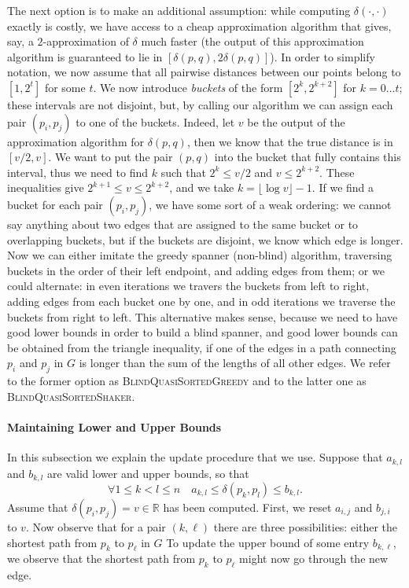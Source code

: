 \documentclass[a4paper,USenglish]{socg-lipics-v2018}
\newcommand{\R}{\mathbb{R}}
\newcommand{\dist}{\delta}
\begin{document}
The next option is to make an additional assumption: while
computing $\dist(\cdot, \cdot)$ exactly is costly, we have access to a cheap approximation algorithm
that gives, say, a $2$-approximation of $\dist$ much faster (the output of this approximation algorithm is guaranteed to
lie in $[\dist(p,q), 2 \dist(p,q)]$). In order to simplify notation, we now assume
that all pairwise distances between our points belong to $[1, 2^t]$ for some $t$.
We now introduce \textit{buckets} of the form $[2^k, 2^{k+2}]$ for $k = 0 \dots t$;
these intervals are not disjoint, but, by calling our algorithm we can assign
each pair $(p_i, p_j)$ to one of the buckets.
Indeed, let $v$ be the output of the approximation algorithm for $\dist(p,q)$,
then we know that the true distance is in $[v/2, v]$. We want to put the pair $(p,q)$ into the bucket
that fully contains this interval, thus we need to find $k$ such that
$2^k \leq v /2$ and $v \leq 2^{k+2}$. These inequalities give $ 2^{k+1} \leq v \leq 2^{k+2}$,
and we take $k = \lfloor \log v \rfloor - 1$.
If we find a bucket for each pair $(p_i, p_j)$, we have some sort of a weak ordering: we cannot say anything
about two edges that are assigned to the same bucket or to overlapping buckets, but if the buckets
are disjoint, we know which edge is longer. Now we can either imitate the greedy spanner (non-blind) algorithm,
traversing buckets in the order of their left endpoint, and adding edges from them; or we could alternate: in even iterations
we travers the buckets from left to right, adding edges from each bucket one by one, and in odd iterations
we traverse the buckets from right to left. This alternative makes sense, because we need to have good lower bounds in
order to build a blind spanner, and good lower bounds can be obtained from the triangle inequality, if one of the edges 
in a path connecting $p_i$ and $p_j$ in $G$ is longer than the sum of the lengths of all other edges.
We refer to the former option as \textsc{BlindQuasiSortedGreedy} and to the latter one as \textsc{BlindQuasiSortedShaker}.


 \paragraph{Maintaining Lower and Upper Bounds}

 In this subsection we explain the update procedure that we use. Suppose that
 $a_{k,l}$ and $b_{k,l}$ are valid lower and upper bounds, so that
\[
     \forall 1 \leq k < l \leq n \quad a_{k,l} \leq \dist(p_k, p_l) \leq b_{k,l}.
\]
Assume that $\dist(p_i,p_j)=v\in\R$ has been computed.
First, we reset $a_{i,j}$ and $b_{j,i}$ to $v$. 
Now observe that for a pair $(k, \ell)$ there are three possibilities:
either the shortest path from $p_k$ to $p_\ell$ in $G$
To update the upper bound of some entry $b_{k,\ell}$,
we observe that the shortest path from $p_k$ to $p_\ell$ might now
go through the new edge. 
\end{document}
